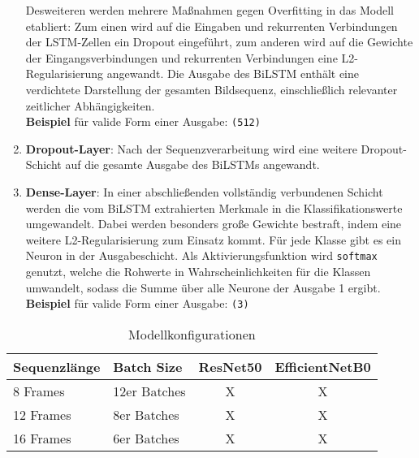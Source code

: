 \documentclass{article}
\newcommand{\resnet}{ResNet50\xspace}
\newcommand{\effnet}{EfficientNetB0\xspace}
\begin{document}
\begin{enumerate}
            Desweiteren werden mehrere Maßnahmen gegen Overfitting in das Modell etabliert:
            Zum einen wird auf die Eingaben und rekurrenten Verbindungen der LSTM-Zellen ein Dropout eingeführt, zum anderen wird auf die Gewichte der Eingangsverbindungen und rekurrenten Verbindungen eine L2-Regularisierung angewandt.
            Die Ausgabe des BiLSTM enthält eine verdichtete Darstellung der gesamten Bildsequenz, einschließlich relevanter zeitlicher Abhängigkeiten. 
            \\\textbf{Beispiel} für valide Form einer Ausgabe: \texttt{(512)}
        \item\textbf{Dropout-Layer}:
            Nach der Sequenzverarbeitung wird eine weitere Dropout-Schicht auf die gesamte Ausgabe des BiLSTMs angewandt.
        \item\textbf{Dense-Layer}:
            In einer abschließenden vollständig verbundenen Schicht werden die vom BiLSTM extrahierten Merkmale in die Klassifikationswerte umgewandelt.
            Dabei werden besonders große Gewichte bestraft, indem eine weitere L2-Regularisierung zum Einsatz kommt.
            Für jede Klasse gibt es ein Neuron in der Ausgabeschicht.
            Als Aktivierungsfunktion wird \texttt{softmax} genutzt, welche die Rohwerte in Wahrscheinlichkeiten für die Klassen umwandelt, sodass die Summe über alle Neurone der Ausgabe 1 ergibt.
            \\\textbf{Beispiel} für valide Form einer Ausgabe: \texttt{(3)}
    \end{enumerate}
    \begin{table}[!h]
        \centering
        \caption{Modellkonfigurationen}
        \begin{tabularx}{\textwidth}{|X|X||c|c|}
            \hline
            \textbf{Sequenzlänge} & \textbf{Batch Size} & \textbf{\resnet} & \textbf{\effnet} \\\hline\hline
            8 Frames & 12er Batches & X & X \\\hline
            12 Frames & 8er Batches & X & X \\\hline
            16 Frames & 6er Batches & X & X \\\hline
        \end{tabularx}
    \end{table}
\end{document}
